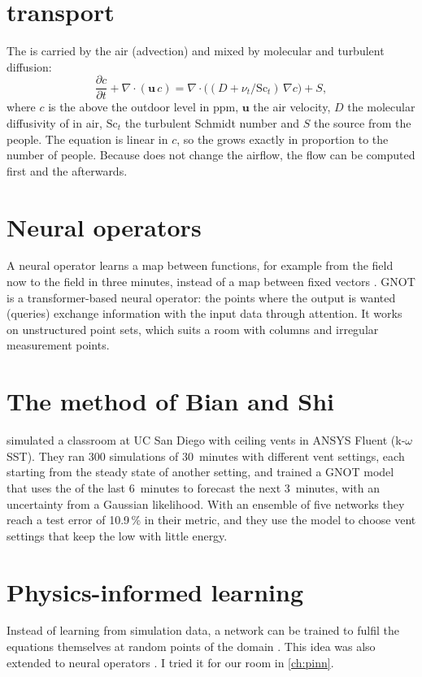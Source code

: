 \section{\cotwo{} transport}
The \cotwo{} is carried by the air (advection) and mixed by molecular and turbulent diffusion:
\begin{equation}
  \frac{\partial c}{\partial t} + \nabla\cdot(\mathbf{u}\,c) = \nabla\cdot\big((D + \nu_t/\mathrm{Sc}_t)\,\nabla c\big) + S,
  \label{eq:co2}
\end{equation}
where $c$ is the \cotwo{} above the outdoor level in ppm, $\mathbf{u}$ the air velocity, $D$ the molecular
diffusivity of \cotwo{} in air, $\mathrm{Sc}_t$ the turbulent Schmidt number and $S$ the source from the
people. The equation is linear in $c$, so the \cotwo{} grows exactly in proportion to the number of people.
Because \cotwo{} does not change the airflow, the flow can be computed first and the \cotwo{} afterwards.

\section{Neural operators}
A neural operator learns a map between functions, for example from the \cotwo{} field now to the \cotwo{}
field in three minutes, instead of a map between fixed vectors \citep{li2021fno}. GNOT \citep{hao2023gnot}
is a transformer-based neural operator: the points where the output is wanted (queries) exchange
information with the input data through attention. It works on unstructured point sets, which suits a room
with columns and irregular measurement points.

\section{The method of Bian and Shi}
\citet{bian2025} simulated a classroom at UC San Diego with ceiling vents in ANSYS Fluent (k-$\omega$ SST).
They ran 300 simulations of 30~minutes with different vent settings, each starting from the steady state of
another setting, and trained a GNOT model that uses the \cotwo{} of the last 6~minutes to forecast the next
3~minutes, with an uncertainty from a Gaussian likelihood. With an ensemble of five networks they reach a
test error of 10.9\,\% in their metric, and they use the model to choose vent settings that keep the
\cotwo{} low with little energy. 

\section{Physics-informed learning}
Instead of learning from simulation data, a network can be trained to fulfil the equations themselves at
random points of the domain \citep{raissi2019}. This idea was also extended to neural operators
\citep{li2021pino}. I tried it for our room in \cref{ch:pinn}.
